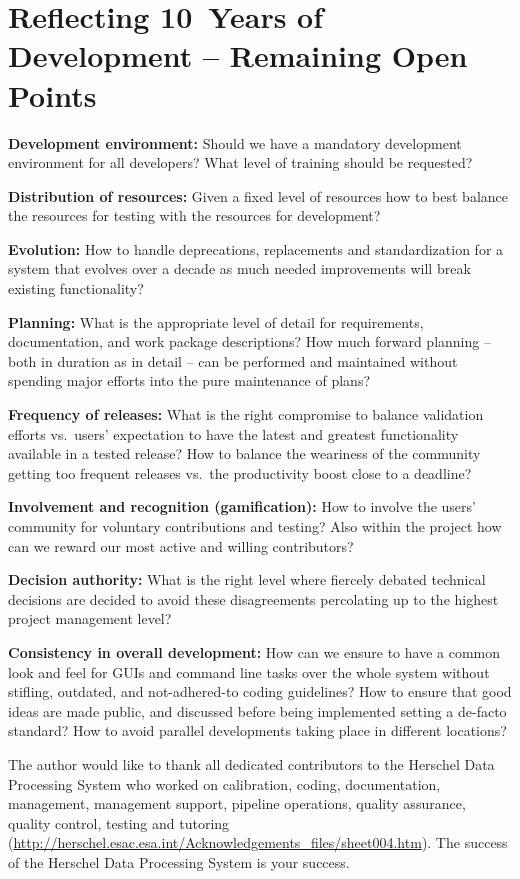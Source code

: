\section{Reflecting 10~Years of Development -- Remaining Open Points}
\begin{description}\addtolength{\itemsep}{-0.6\baselineskip}
\item {\bf Development environment:} Should we have a mandatory development environment for all developers? What level of training should be requested?
\item {\bf Distribution of resources:} Given a fixed level of resources how to best balance the resources for testing with the resources for development?
\item {\bf Evolution:} How to handle deprecations, replacements and standardization for a system that evolves over a decade as much needed improvements will break existing functionality?
\item {\bf Planning:} What is the appropriate level of detail for requirements, documentation, and work package descriptions? How much forward planning -- both in duration as in detail -- can be performed and maintained without spending major efforts into the pure maintenance of plans?
\item {\bf Frequency of releases:} What is the right compromise to balance validation efforts vs.\ users' expectation to have the latest and greatest functionality available in a tested release? How to balance the weariness of the community getting too frequent releases vs.\ the productivity boost close to a deadline?
\item {\bf Involvement and recognition (gamification):} How to involve the users' community for voluntary contributions and testing? Also within the project how can we reward our most active and willing contributors?
\item {\bf Decision authority:} What is the right level where fiercely debated technical decisions are decided to avoid these disagreements percolating up to the highest project management level?
\item {\bf Consistency in overall development:} How can we ensure to have a common look and feel for GUIs and command line tasks over the whole system without stifling, outdated, and not-adhered-to coding guidelines? How to ensure that good ideas are made public, and discussed before being implemented setting a de-facto standard? How to avoid parallel developments taking place in different locations?
\end {description}

\acknowledgements The author would like to thank all dedicated contributors to the Herschel Data Processing System who worked on calibration, coding, documentation, management, management support, pipeline operations, quality assurance, quality control, testing and tutoring (\url{http://herschel.esac.esa.int/Acknowledgements\_files/sheet004.htm}). The success of the Herschel Data Processing System is your success.


